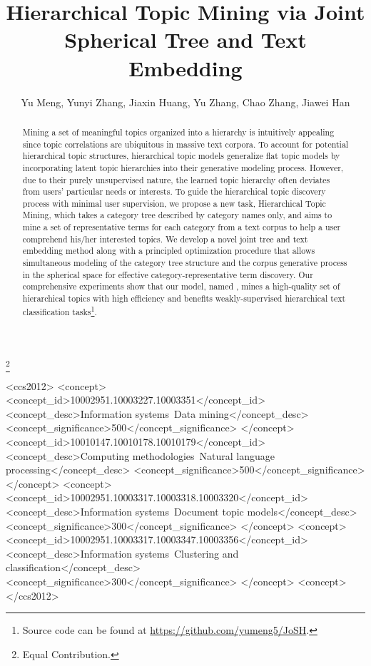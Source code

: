 \documentclass[sigconf]{acmart}
\theoremstyle{definition}
\begin{document}
\fancyhead{}

\leftmargini=12pt \title{Hierarchical Topic Mining via Joint Spherical Tree and Text Embedding}




\author{Yu Meng, Yunyi Zhang, Jiaxin Huang, Yu Zhang, Chao Zhang, Jiawei Han}
\thanks{Equal Contribution.}







\begin{abstract}
Mining a set of meaningful topics organized into a hierarchy is intuitively appealing since topic correlations are ubiquitous in massive text corpora.
To account for potential hierarchical topic structures, hierarchical topic models generalize flat topic models by incorporating latent topic hierarchies into their generative modeling process.
However, due to their purely unsupervised nature, the learned topic hierarchy often deviates from users' particular needs or interests. 
To guide the hierarchical topic discovery process with minimal user supervision, we propose a new task, Hierarchical Topic Mining, which takes a category tree described by category names only, and aims to mine a set of representative terms for each category from a text corpus to help a user comprehend his/her interested topics.
We develop a novel joint tree and text embedding method along with a principled optimization procedure that allows simultaneous modeling of the category tree structure and the corpus generative process in the spherical space for effective category-representative term discovery. 
Our comprehensive experiments show that our model, named \josh, mines a high-quality set of hierarchical topics with high efficiency and benefits weakly-supervised hierarchical text classification tasks\footnote{Source code can be found at \url{https://github.com/yumeng5/JoSH}.}. 
\end{abstract}
 
\begin{CCSXML}
<ccs2012>
<concept>
<concept_id>10002951.10003227.10003351</concept_id>
<concept_desc>Information systems~Data mining</concept_desc>
<concept_significance>500</concept_significance>
</concept>
<concept_id>10010147.10010178.10010179</concept_id>
<concept_desc>Computing methodologies~Natural language processing</concept_desc>
<concept_significance>500</concept_significance>
</concept>
<concept>
<concept_id>10002951.10003317.10003318.10003320</concept_id>
<concept_desc>Information systems~Document topic models</concept_desc>
<concept_significance>300</concept_significance>
</concept>
<concept>
<concept_id>10002951.10003317.10003347.10003356</concept_id>
<concept_desc>Information systems~Clustering and classification</concept_desc>
<concept_significance>300</concept_significance>
</concept>
<concept>
</ccs2012>
\end{CCSXML}
\end{document}
